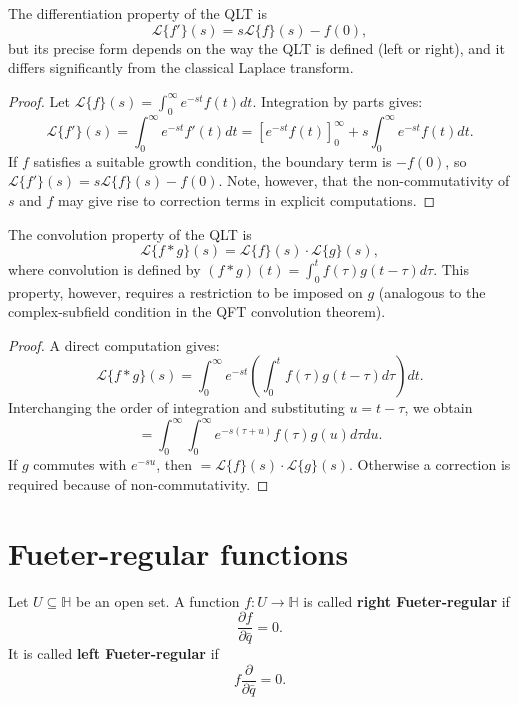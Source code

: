 \begin{theorem}\label{thm:q_laplace_derivative}
The differentiation property of the QLT is
\[
\mathcal{L}\{f'\}(s)=s\mathcal{L}\{f\}(s)-f(0),
\]
but its precise form depends on the way the QLT is defined (left or right), and it differs significantly from the classical Laplace transform.
\end{theorem}

\begin{proof}
Let $\mathcal{L}\{f\}(s)=\int_0^\infty e^{-st}f(t)dt$. Integration by parts gives:
\[
\mathcal{L}\{f'\}(s)=\int_0^\infty e^{-st}f'(t)dt=[e^{-st}f(t)]_0^\infty+s\int_0^\infty e^{-st}f(t)dt.
\]
If $f$ satisfies a suitable growth condition, the boundary term is $-f(0)$, so $\mathcal{L}\{f'\}(s)=s\mathcal{L}\{f\}(s)-f(0)$. Note, however, that the non-commutativity of $s$ and $f$ may give rise to correction terms in explicit computations.
\end{proof}

\begin{theorem}\label{thm:q_laplace_convolution}
The convolution property of the QLT is
\[
\mathcal{L}\{f*g\}(s)=\mathcal{L}\{f\}(s)\cdot\mathcal{L}\{g\}(s),
\]
where convolution is defined by $(f*g)(t)=\int_0^t f(\tau)g(t-\tau)d\tau$. This property, however, requires a restriction to be imposed on $g$ (analogous to the complex-subfield condition in the QFT convolution theorem).
\end{theorem}

\begin{proof}
A direct computation gives:
\[
\mathcal{L}\{f*g\}(s)=\int_0^\infty e^{-st}\left(\int_0^t f(\tau)g(t-\tau)d\tau\right)dt.
\]
Interchanging the order of integration and substituting $u=t-\tau$, we obtain
\[
=\int_0^\infty\int_0^\infty e^{-s(\tau+u)}f(\tau)g(u)d\tau du.
\]
If $g$ commutes with $e^{-su}$, then $=\mathcal{L}\{f\}(s)\cdot\mathcal{L}\{g\}(s)$. Otherwise a correction is required because of non-commutativity.
\end{proof}

\section{Fueter-regular functions}\label{sec:q_fueter_regular}

\begin{definition}\label{def:q_fueter_regular}
Let $U\subseteq\mathbb{H}$ be an open set. A function $f:U\to\mathbb{H}$ is called \textbf{right Fueter-regular} if
\[
\frac{\partial f}{\partial\bar q}=0.
\]
It is called \textbf{left Fueter-regular} if
\[
f\frac{\partial}{\partial\bar q}=0.
\]
\end{definition}

